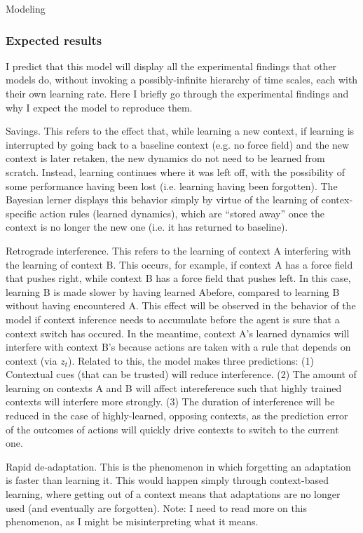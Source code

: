 \documentclass{report}
\begin{document}
\begin{chapter}{Modeling}
\subsubsection{Expected results}
I predict that this model will display all the experimental findings that other
models do, without invoking a possibly-infinite hierarchy of time scales, each
with their own learning rate. Here I briefly go through the experimental
findings and why I expect the model to reproduce them.

Savings. This refers to the effect that, while learning a new context, if
learning is interrupted by going back to a baseline context (e.g. no force
field) and the new context is later retaken, the new dynamics do not need to be
learned from scratch. Instead, learning continues where it was left off, with
the possibility of some performance having been lost (i.e. learning having been
forgotten). The Bayesian lerner displays this behavior simply by virtue of the
learning of contex-specific action rules (learned dynamics), which are ``stored
away'' once the context is no longer the new one (i.e. it has returned to
baseline).

Retrograde interference. This refers to the learning of context A interfering
with the learning of context B. This occurs, for example, if context A has a
force field that pushes right, while context B has a force field that pushes
left. In this case, learning B is made slower by having learned Abefore,
compared to learning B without having encountered A. This effect will be
observed in the behavior of the model if context inference needs to accumulate
before the agent is sure that a context switch has occured. In the meantime,
context A's learned dynamics will interfere with context B's because actions are
taken with a rule that depends on context (via $z_t$). Related to this, the
model makes three predictions: (1) Contextual cues (that can be trusted) will
reduce interference. (2) The amount of learning on contexts A and B will affect
intereference such that highly trained contexts will interfere more
strongly. (3) The duration of interference will be reduced in the case of
highly-learned, opposing contexts, as the prediction error of the outcomes of
actions will quickly drive contexts to switch to the current one.

Rapid de-adaptation. This is the phenomenon in which forgetting an adaptation is
faster than learning it. This would happen simply through context-based
learning, where getting out of a context means that adaptations are no longer
used (and eventually are forgotten). Note: I need to read more on this
phenomenon, as I might be misinterpreting what it means.


\end{chapter}
\end{document}
